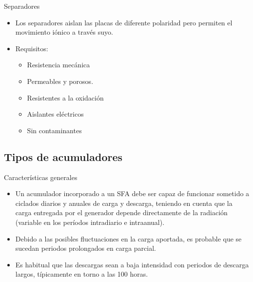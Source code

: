 \documentclass[xcolor={usenames,svgnames,dvipsnames}]{beamer}
\begin{document}
\begin{frame}[label={sec:orga7e4a4a}]{Separadores}
\begin{itemize}
\item Los separadores \alert{aislan las placas de diferente polaridad pero
permiten el movimiento iónico a través suyo}.
\item Requisitos:
\begin{itemize}
\item Resistencia mecánica
\item Permeables y porosos.
\item Resistentes a la oxidación
\item Aislantes eléctricos
\item Sin contaminantes
\end{itemize}
\end{itemize}
\end{frame}

\subsection{Tipos de acumuladores}
\label{sec:orge366012}

\begin{frame}[label={sec:org20da003}]{Características generales}
\begin{itemize}
\item Un acumulador incorporado a un SFA debe ser \alert{capaz de funcionar sometido a ciclados diarios y anuales de carga y descarga}, teniendo en cuenta que la carga entregada por el generador depende directamente de la radiación (variable en los períodos intradiario e intraanual).

\item Debido a las posibles fluctuaciones en la carga aportada, es probable que se sucedan \alert{periodos prolongados en carga parcial}.

\item Es habitual que las \alert{descargas sean a baja intensidad con periodos de descarga largos}, típicamente en torno a las 100 horas.
\end{itemize}
\end{frame}
\end{document}
